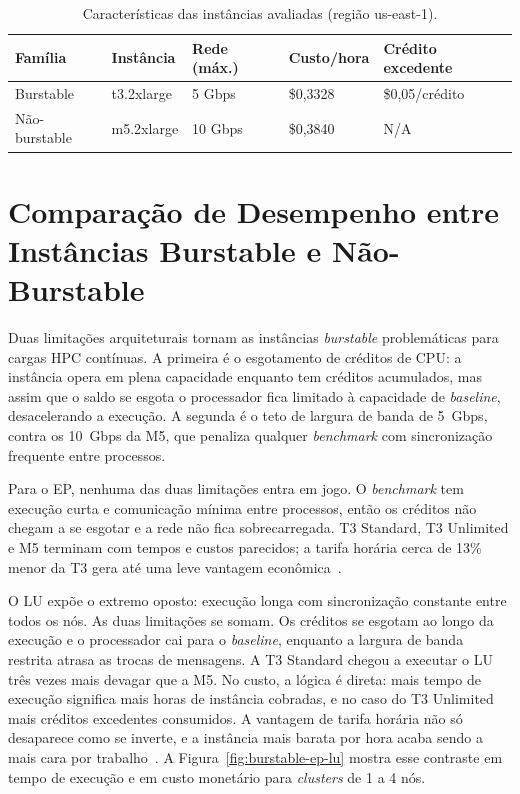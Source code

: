 \begin{table}[htb]
  \centering
  \caption{Características das instâncias avaliadas (região us-east-1).}
  \label{tab:burstable-instancias}
  \begin{tabular}{l l l l l}
    \toprule
    \textbf{Família} & \textbf{Instância} & \textbf{Rede (máx.)} & \textbf{Custo/hora} & \textbf{Crédito excedente} \\
    \midrule
    Burstable     & t3.2xlarge & 5 Gbps  & \$0,3328 & \$0,05/crédito \\
    Não-burstable & m5.2xlarge & 10 Gbps & \$0,3840 & N/A \\
    \bottomrule
  \end{tabular}
\end{table}

\section{Comparação de Desempenho entre Instâncias Burstable e Não-Burstable}
\label{sec:burstable-resultados}

Duas limitações arquiteturais tornam as instâncias \textit{burstable} problemáticas para
cargas HPC contínuas. A primeira é o esgotamento de créditos de CPU: a instância opera em
plena capacidade enquanto tem créditos acumulados, mas assim que o saldo se esgota o
processador fica limitado à capacidade de \textit{baseline}, desacelerando a execução. A
segunda é o teto de largura de banda de 5~Gbps, contra os 10~Gbps da M5, que penaliza
qualquer \textit{benchmark} com sincronização frequente entre processos.

Para o EP, nenhuma das duas limitações entra em jogo. O \textit{benchmark} tem execução
curta e comunicação mínima entre processos, então os créditos não chegam a se esgotar e a
rede não fica sobrecarregada. T3 Standard, T3 Unlimited e M5 terminam com tempos e custos
parecidos; a tarifa horária cerca de 13\% menor da T3 gera até uma leve vantagem
econômica~\cite{soda2025erad,soda2025wcc}.

O LU expõe o extremo oposto: execução longa com sincronização constante entre todos os nós.
As duas limitações se somam. Os créditos se esgotam ao longo da execução e o processador
cai para o \textit{baseline}, enquanto a largura de banda restrita atrasa as trocas de
mensagens. A T3 Standard chegou a executar o LU três vezes mais devagar que a M5. No custo,
a lógica é direta: mais tempo de execução significa mais horas de instância cobradas, e no
caso do T3 Unlimited mais créditos excedentes consumidos. A vantagem de tarifa horária não
só desaparece como se inverte, e a instância mais barata por hora acaba sendo a mais cara
por trabalho~\cite{soda2025wcc}. A Figura~\ref{fig:burstable-ep-lu} mostra esse contraste
em tempo de execução e em custo monetário para \textit{clusters} de 1 a 4 nós.

